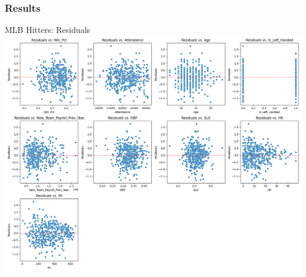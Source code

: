 \documentclass[9pt]{beamer}
\begin{document}
\begin{frame}
    \frametitle{Results}
    \begin{block}{MLB Hitters: Residuals}
        \centering
        \includegraphics[height=0.75\textheight,keepaspectratio]{images/mlb_hitters_residuals.png}
    \end{block}
\end{frame}
\end{document}
